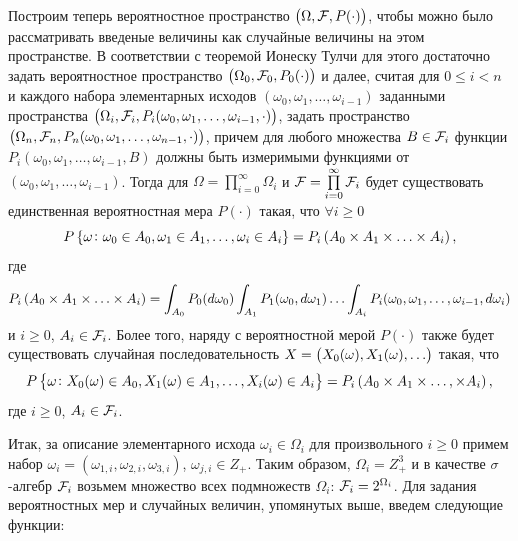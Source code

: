 \documentclass[a4paper,12pt,russian]{extarticle}
\begin{document}
Построим теперь 	вероятностное пространство $\left(\Omega, {\cal F}, P(\cdot)\right)$, чтобы можно было рассматривать введеные величины как случайные величины на этом пространстве. В соответствии с теоремой Ионеску Тулчи для этого достаточно задать вероятностное пространство $\left(\Omega_0, {\cal F}_0, P_0(\cdot)\right)$ и далее, считая для $0 \leqslant i < n$ и каждого набора элементарных исходов $(\omega_0, \omega_1, \ldots, \omega_{i-1})$ заданными пространства $\left(\Omega_i, {\cal F}_i, P_i(\omega_0,\omega_1,\ldots, \omega_{i-1},\cdot)\right)$, задать пространство $\left(\Omega_n, {\cal F}_n, P_n(\omega_0,\omega_1,\ldots, \omega_{n-1},\cdot)\right)$, причем для любого множества $B\in {\cal F}_i$ функции $P_i(\omega_0,\omega_1,\ldots, \omega_{i-1},B)$
должны быть измеримыми функциями от $(\omega_0, \omega_1, \ldots, \omega_{i-1})$. Тогда для $\Omega=\prod\limits_{i=0}^{\infty}\Omega_i$ и ${\cal F}=\prod\limits_{i=0}^{\infty} {\cal F}_i$ будет существовать единственная вероятностная мера $P(\cdot)$ такая, что $\forall i \geqslant 0$
\begin{equation*}
P\left\{\omega \colon \omega_0 \in A_0, \omega_1 \in A_1, \ldots, \omega_i\in A_i\right\} = P_i\left(A_0 \times A_1 \times \ldots \times A_i\right),
\end{equation*}
где 
\begin{equation}
 P_i\left(A_0 \times A_1 \times \ldots \times A_i\right) = \int_{A_0} P_0(d \omega_0) \int_{A_1} P_1(\omega_0,d \omega_1) \ldots \int_{A_i} P_i(\omega_0, \omega_1, \ldots, \omega_{i-1}, d \omega_i)
\label{ProbabilitiesGeneralOne}
\end{equation}
и $i\geqslant 0$, $A_i\in {\cal F}_i$. Более того, наряду с вероятностной мерой $P(\cdot)$ также будет существовать случайная последовательность $X=\left(X_0(\omega), X_1(\omega), \ldots\right)$ такая, что
\begin{equation}
P\left\{\omega \colon X_0(\omega) \in A_0, X_1(\omega)\in A_1, \ldots, X_i(\omega)\in A_i\right\} = P_i\left(A_0\times A_1 \times \ldots, \times A_i\right),
\label{ProbabilitiesGeneralTwo}
\end{equation}
где $i\geqslant 0$, $A_i\in {\cal F}_i$.

Итак, за описание элементарного исхода $\omega_i \in \Omega_i$ для произвольного $i \geqslant 0$ примем набор $\omega_i=(\omega_{1,i},\omega_{2,i},\omega_{3,i})$, $\omega_{j,i}\in Z_+$. Таким образом, $\Omega_i=Z_+^3$ и в качестве $\sigma$-алгебр ${\cal F}_i$ возьмем множество всех подмножеств $\Omega_i$: ${\cal F}_i=2^{\Omega_i}$. Для задания вероятностных мер и случайных величин, упомянутых выше, введем следующие функции:
\end{document}
